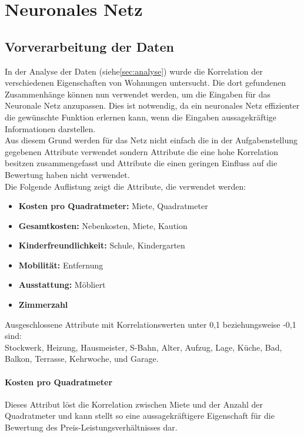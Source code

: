 \section{Neuronales Netz}\label{sec:nn}
\subsection{Vorverarbeitung der Daten}
In der Analyse der Daten (siehe\autoref{sec:analyse}) wurde die Korrelation 
der verschiedenen Eigenschaften von Wohnungen untersucht. Die dort gefundenen
Zusammenhänge können nun verwendet werden, um die Eingaben für das Neuronale 
Netz anzupassen. Dies ist notwendig, da ein neuronales Netz effizienter
die gewünschte Funktion erlernen kann, wenn die Eingaben aussagekräftige 
Informationen darstellen. \\
Aus diesem Grund werden für das Netz nicht einfach die in der Aufgabenstellung 
gegebenen Attribute verwendet sondern Attribute die eine hohe Korrelation besitzen
zusammengefasst und Attribute die einen geringen Einfluss auf die Bewertung haben
nicht verwendet. \\
Die Folgende Auflistung zeigt die Attribute, die verwendet werden: 
\begin{itemize}\label{lst:Eigenschaften}
    \item \textbf{Kosten pro Quadratmeter:} Miete, Quadratmeter
    \item \textbf{Gesamtkosten:} Nebenkosten, Miete, Kaution
    \item \textbf{Kinderfreundlichkeit:} Schule, Kindergarten
    \item \textbf{Mobilität:} Entfernung
    \item \textbf{Ausstattung:} Möbliert
    \item \textbf{Zimmerzahl}
\end{itemize}

Ausgeschlossene Attribute mit Korrelationswerten unter 0,1 beziehungsweise -0,1 sind:\\
Stockwerk, Heizung, Hausmeister, S-Bahn, Alter, Aufzug, Lage, Küche, Bad, Balkon, Terrasse, Kehrwoche, 
und Garage.

\paragraph{Kosten pro Quadratmeter}
Dieses Attribut löst die Korrelation zwischen Miete und der Anzahl der Quadratmeter und kann 
stellt so eine aussagekräftigere Eigenschaft für die Bewertung des Preis-Leistungsverhältnisses dar.


